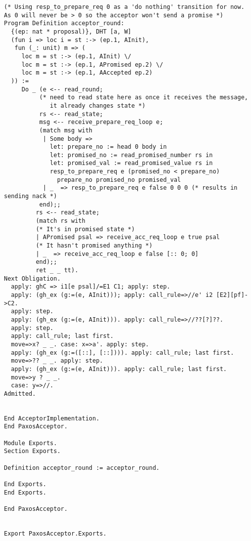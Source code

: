 \begin{landscape}
\begin{multicols*}{2}
\begin{lstlisting}[style=SourceCodeListing]
(* Using resp_to_prepare_req 0 as a 'do nothing' transition for now.
As 0 will never be > 0 so the acceptor won't send a promise *)
Program Definition acceptor_round:
  {(ep: nat * proposal)}, DHT [a, W]
  (fun i => loc i = st :-> (ep.1, AInit),
   fun (_: unit) m => (
     loc m = st :-> (ep.1, AInit) \/
     loc m = st :-> (ep.1, APromised ep.2) \/
     loc m = st :-> (ep.1, AAccepted ep.2)
  )) :=
     Do _ (e <-- read_round;
          (* need to read state here as once it receives the message,
             it already changes state *)
          rs <-- read_state;
          msg <-- receive_prepare_req_loop e;
          (match msg with
           | Some body =>
             let: prepare_no := head 0 body in
             let: promised_no := read_promised_number rs in
             let: promised_val := read_promised_value rs in
             resp_to_prepare_req e (promised_no < prepare_no)
               prepare_no promised_no promised_val
           | _  => resp_to_prepare_req e false 0 0 0 (* results in sending nack *)
          end);;
         rs <-- read_state;
         (match rs with
         (* It's in promised state *)
         | APromised psal => receive_acc_req_loop e true psal
         (* It hasn't promised anything *)
         | _  => receive_acc_req_loop e false [:: 0; 0]
         end);;
         ret _ _ tt).
Next Obligation.
  apply: ghC => i1[e psal]/=E1 C1; apply: step.
  apply: (gh_ex (g:=(e, AInit))); apply: call_rule=>//e' i2 [E2][pf]->C2.
  apply: step.
  apply: (gh_ex (g:=(e, AInit))). apply: call_rule=>//??[?]??.
  apply: step.
  apply: call_rule; last first.
  move=>x? _ _. case: x=>a'. apply: step.
  apply: (gh_ex (g:=([::], [::]))). apply: call_rule; last first.
  move=>?? _ _. apply: step.
  apply: (gh_ex (g:=(e, AInit))). apply: call_rule; last first.
  move=>y ? _ _.
  case: y=>//.
Admitted.


End AcceptorImplementation.
End PaxosAcceptor.

Module Exports.
Section Exports.

Definition acceptor_round := acceptor_round.

End Exports.
End Exports.

End PaxosAcceptor.


Export PaxosAcceptor.Exports.
\end{lstlisting}
\end{multicols*}

\newpage


\end{landscape}
